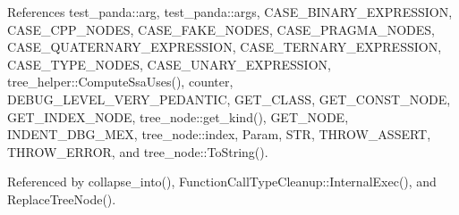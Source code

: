 References test\+\_\+panda\+::arg, test\+\_\+panda\+::args, C\+A\+S\+E\+\_\+\+B\+I\+N\+A\+R\+Y\+\_\+\+E\+X\+P\+R\+E\+S\+S\+I\+ON, C\+A\+S\+E\+\_\+\+C\+P\+P\+\_\+\+N\+O\+D\+ES, C\+A\+S\+E\+\_\+\+F\+A\+K\+E\+\_\+\+N\+O\+D\+ES, C\+A\+S\+E\+\_\+\+P\+R\+A\+G\+M\+A\+\_\+\+N\+O\+D\+ES, C\+A\+S\+E\+\_\+\+Q\+U\+A\+T\+E\+R\+N\+A\+R\+Y\+\_\+\+E\+X\+P\+R\+E\+S\+S\+I\+ON, C\+A\+S\+E\+\_\+\+T\+E\+R\+N\+A\+R\+Y\+\_\+\+E\+X\+P\+R\+E\+S\+S\+I\+ON, C\+A\+S\+E\+\_\+\+T\+Y\+P\+E\+\_\+\+N\+O\+D\+ES, C\+A\+S\+E\+\_\+\+U\+N\+A\+R\+Y\+\_\+\+E\+X\+P\+R\+E\+S\+S\+I\+ON, tree\+\_\+helper\+::\+Compute\+Ssa\+Uses(), counter, D\+E\+B\+U\+G\+\_\+\+L\+E\+V\+E\+L\+\_\+\+V\+E\+R\+Y\+\_\+\+P\+E\+D\+A\+N\+T\+IC, G\+E\+T\+\_\+\+C\+L\+A\+SS, G\+E\+T\+\_\+\+C\+O\+N\+S\+T\+\_\+\+N\+O\+DE, G\+E\+T\+\_\+\+I\+N\+D\+E\+X\+\_\+\+N\+O\+DE, tree\+\_\+node\+::get\+\_\+kind(), G\+E\+T\+\_\+\+N\+O\+DE, I\+N\+D\+E\+N\+T\+\_\+\+D\+B\+G\+\_\+\+M\+EX, tree\+\_\+node\+::index, Param, S\+TR, T\+H\+R\+O\+W\+\_\+\+A\+S\+S\+E\+RT, T\+H\+R\+O\+W\+\_\+\+E\+R\+R\+OR, and tree\+\_\+node\+::\+To\+String().



Referenced by collapse\+\_\+into(), Function\+Call\+Type\+Cleanup\+::\+Internal\+Exec(), and Replace\+Tree\+Node().

